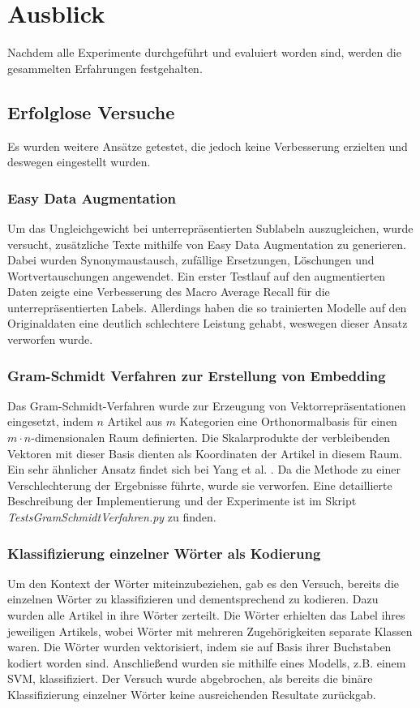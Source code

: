 \section{Ausblick}
\label{Ausblick}
Nachdem alle Experimente durchgeführt und evaluiert worden sind, werden die gesammelten Erfahrungen festgehalten.

\subsection{Erfolglose Versuche}
Es wurden weitere Ansätze getestet, die jedoch keine Verbesserung erzielten und deswegen eingestellt wurden.

\subsubsection{Easy Data Augmentation}
\label{EDA}
Um das Ungleichgewicht bei unterrepräsentierten Sublabeln auszugleichen, wurde versucht, zusätzliche Texte mithilfe von Easy Data Augmentation \cite{Wei2019} zu generieren. Dabei wurden Synonymaustausch, zufällige Ersetzungen, Löschungen und Wortvertauschungen angewendet. Ein erster Testlauf  auf den augmentierten Daten zeigte eine Verbesserung  des Macro Average Recall für die unterrepräsentierten Labels. Allerdings haben die so trainierten Modelle auf den Originaldaten eine deutlich schlechtere Leistung gehabt, weswegen dieser Ansatz verworfen wurde.

\subsubsection{Gram-Schmidt Verfahren zur Erstellung von Embedding}
\label{sec:gram}
Das Gram-Schmidt-Verfahren wurde zur Erzeugung von Vektorrepräsentationen eingesetzt, indem $n$ Artikel aus $m$ Kategorien eine Orthonormalbasis für einen $m\cdot n$-dimensionalen Raum definierten. Die Skalarprodukte der verbleibenden Vektoren mit dieser Basis dienten als Koordinaten der Artikel in diesem Raum. Ein sehr ähnlicher Ansatz findet sich bei Yang et al. \cite{Yang2019}. Da die Methode zu einer Verschlechterung der Ergebnisse führte, wurde sie verworfen. Eine detaillierte Beschreibung der Implementierung und der Experimente ist im Skript \textit{TestsGramSchmidtVerfahren.py} zu finden.

\subsubsection{Klassifizierung einzelner Wörter als Kodierung}
\label{sec:wordcoding}
Um den Kontext der Wörter miteinzubeziehen, gab es den Versuch, bereits die einzelnen Wörter zu klassifizieren und dementsprechend zu kodieren. Dazu wurden alle Artikel in ihre Wörter zerteilt. Die Wörter erhielten das Label ihres jeweiligen Artikels, wobei Wörter mit mehreren Zugehörigkeiten separate Klassen waren. Die Wörter wurden vektorisiert, indem sie auf Basis ihrer Buchstaben kodiert worden sind. Anschließend wurden sie mithilfe eines Modells, z.B. einem SVM, klassifiziert. Der Versuch wurde abgebrochen, als bereits die binäre Klassifizierung einzelner Wörter keine ausreichenden Resultate zurückgab.

